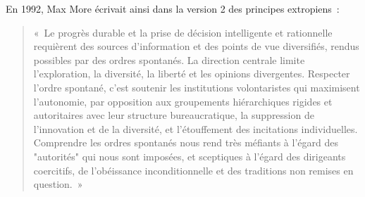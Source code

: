 En 1992, Max More écrivait ainsi dans la version 2 des principes extropiens~:

\begin{quote}
«~Le progrès durable et la prise de décision intelligente et rationnelle requièrent des sources d'information et des points de vue diversifiés, rendus possibles par des ordres spontanés. La direction centrale limite l'exploration, la diversité, la liberté et les opinions divergentes. Respecter l'ordre spontané, c'est soutenir les institutions volontaristes qui maximisent l'autonomie, par opposition aux groupements hiérarchiques rigides et autoritaires avec leur structure bureaucratique, la suppression de l'innovation et de la diversité, et l'étouffement des incitations individuelles. Comprendre les ordres spontanés nous rend très méfiants à l'égard des "autorités" qui nous sont imposées, et sceptiques à l'égard des dirigeants coercitifs, de l'obéissance inconditionnelle et des traditions non remises en question.~»
\end{quote}

%

